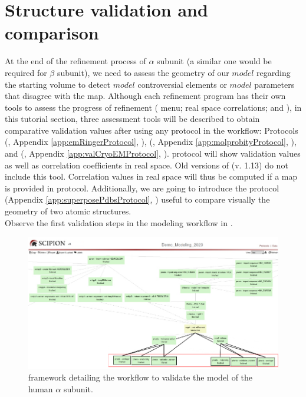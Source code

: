 \section{Structure validation and comparison}
\label{seq:structurevalidation}
 At the end of the refinement process of  $\alpha$ subunit (a similar one would be required for $\beta$ subunit), we need to assess the geometry of our $model$ regarding the starting volume to detect $model$ controversial elements or $model$ parameters that disagree with the map. Although each refinement program has their own tools to assess the progress of refinement (\coot {} menu; \phenix {} real space correlations;  {} and ), in this tutorial section, three assessment tools will be described to obtain comparative validation values after using any protocol in the workflow:  Protocols \emringer (, Appendix \ref{app:emRingerProtocol}, \citep{barad2015}), \molprobity (, Appendix \ref{app:molprobityProtocol}, \citep{davis2004}), and \validationCryoEM (, Appendix \ref{app:valCryoEMProtocol}, \citep{afonine2018b}). \validationCryoEM protocol will show \molprobity validation values as well as correlation coefficients in real space. Old versions of \phenix (v. 1.13) do not include this tool. Correlation values in real space will thus be computed if a map is provided in \molprobity protocol. Additionally, we are going to introduce the protocol  (Appendix \ref{app:superposePdbsProtocol}, \citep{zwartUrl}) useful to compare visually the geometry of two atomic structures.\\
 
 Observe the first validation steps in the modeling \scipion workflow in .

 \begin{figure}[H]
  \centering 
  \captionsetup{width=.9\linewidth} 
  \includegraphics[width=1\textwidth]{Images/Fig69}
  \caption{\scipion framework detailing the workflow to validate the model of the human  $\alpha$ subunit.}
  \label{fig:scipion_workflow_validation}
  \end{figure}
 
